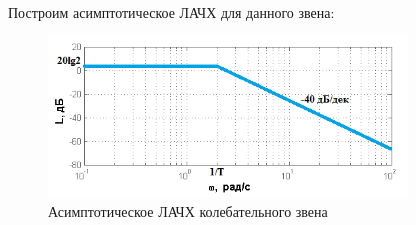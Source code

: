 \documentclass[a4paper, 11pt, russian]{article}
\begin{document}
    \newpage
    Построим асимптотическое ЛАЧХ для данного звена:
    \begin{figure}[ht!]
        \centering
        \includegraphics[width = 0.85\textwidth]{oscillatoryLinkAsymp}
        \caption{Асимптотическое ЛАЧХ колебательного звена}
    \end{figure}
    
    \clearpage
\end{document}
